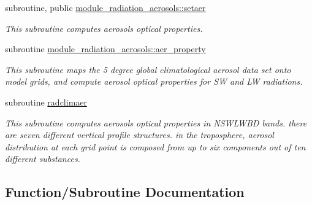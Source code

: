 {\bf }\par
\begin{DoxyCompactItemize}
\item 
subroutine, public \hyperlink{group__module__radiation__aerosols_ga5ae70d305b752d2f77954495fab1b432}{module\+\_\+radiation\+\_\+aerosols\+::setaer}
\begin{DoxyCompactList}\small\item\em This subroutine computes aerosols optical properties. \end{DoxyCompactList}\end{DoxyCompactItemize}

{\bf }\par
\begin{DoxyCompactItemize}
\item 
subroutine \hyperlink{group__module__radiation__aerosols_ga021aee92f6c64f78fc11e26d5b2288cf}{module\+\_\+radiation\+\_\+aerosols\+::aer\+\_\+property}
\begin{DoxyCompactList}\small\item\em This subroutine maps the 5 degree global climatological aerosol data set onto model grids, and compute aerosol optical properties for SW and LW radiations. \end{DoxyCompactList}\end{DoxyCompactItemize}

{\bf }\par
\begin{DoxyCompactItemize}
\item 
subroutine \hyperlink{zhang__orig_2radiation__aerosols_8f_ae60b55ebc37825b2c3c95f95b23ed558}{radclimaer}
\begin{DoxyCompactList}\small\item\em This subroutine computes aerosols optical properties in N\+S\+W\+L\+W\+BD bands. there are seven different vertical profile structures. in the troposphere, aerosol distribution at each grid point is composed from up to six components out of ten different substances. \end{DoxyCompactList}\end{DoxyCompactItemize}



\subsection{Function/\+Subroutine Documentation}
